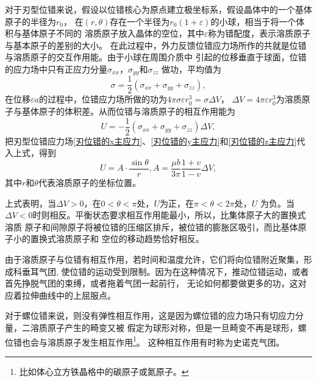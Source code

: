                     对于刃型位错来说，假设以位错核心为原点建立极坐标系，假设晶体中的一个基体原子的半径为$r_0$，
                    在$(r,\theta)$存在一个半径为$r_0(1+\varepsilon)$的小球，相当于将一个体积与基体原子不同的
                    溶质原子放入晶体的空位，其中$\varepsilon$称为错配度，表示溶质原子与基本原子的差别的大小。
                    在此过程中，外力反馈位错应力场所作的共就是位错与溶质原子的交互作用能。由于小球在周围介质中
                    引起的位移垂直于球面，位错的应力场中只有正应力分量$\sigma_{xx}$，$\sigma_{yy}$和$\sigma_{zz}$
                    做功，平均值为
                    \begin{equation}
                        \sigma=\frac{1}{2}\left( \sigma_{xx}+\sigma_{yy}+\sigma_{zz} \right),
                    \end{equation}
                    在位移$\varepsilon a$的过程中，位错应力场所做的功为$4\pi\sigma\varepsilon r_0^3=\sigma\Delta V$，
                    $\Delta V=4\pi\varepsilon r_0^3$为溶质原子与基体原子的体积差。从而位错与溶质原子的相互作用能为
                    \begin{equation}
                        U=-\frac{1}{2}\left( \sigma_{xx}+\sigma_{yy}+\sigma_{zz} \right)\Delta V,
                    \end{equation}
                    把刃型位错应力场\autoref{刃位错的x主应力}、\autoref{刃位错的y主应力}和\autoref{刃位错的z主应力}代入上式，得到
                    \begin{equation}
                        U=A\cdot\frac{\sin\theta}{r},A=\frac{\mu b}{3\pi}\frac{1+v}{1-v}\Delta V,
                    \end{equation}
                    其中$r$和$\theta$代表溶质原子的坐标位置。

                    上式表明，当$\Delta V>0$，在$0<\theta<\pi$处，$U$为正，在$\pi<\theta<2\pi$处，$U$
                    为负。当$\Delta V<0$时则相反。平衡状态要求相互作用能最小，所以，比集体原子大的置换式溶质
                    原子和间隙原子将被位错的压缩区排斥，被位错的膨胀区吸引，而比基体原子小的置换式溶质原子和
                    空位的移动趋势恰好相反。

                    由于溶质原子与位错有相互作用，若时间和温度允许，它们将向位错附近聚集，形成科垂耳气团,
                    使位错的运动受到限制。因为在这种情况下，推动位错运动，或者首先挣脱气团的束缚，或者拖着气团一起前行，
                    无论如何都要做更多的功，这对应着拉伸曲线中的上屈服点。

                    对于螺位错来说，则没有弹性相互作用，这是因为螺位错的应力场只有切应力分量，二溶质原子产生的畸变又被
                    假定为球形对称，但是一旦畸变不再是球形，螺位错也会与溶质原子发生相互作用\footnote{比如体心立方铁晶格中的碳原子或氮原子。}。
                    这种相互作用有时称为史诺克气团。

